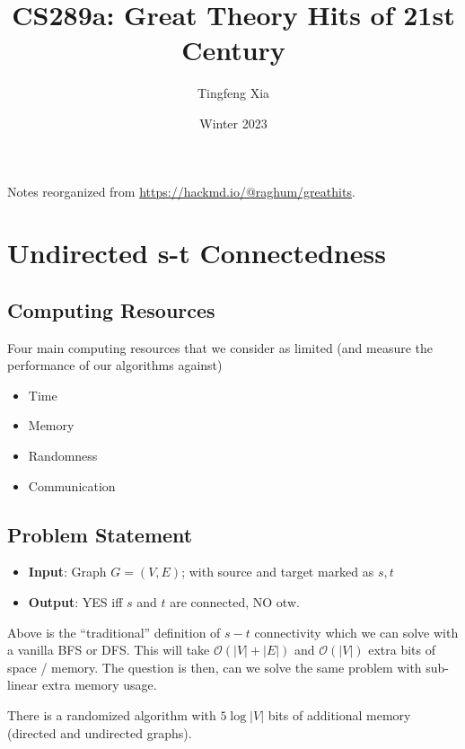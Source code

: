 \documentclass[11pt, letter]{book}
\author{Tingfeng Xia}
\title{CS289a: Great Theory Hits of 21st Century}
\date{Winter 2023}
\begin{document}
\maketitle

\vspace*{\fill}
Notes reorganized from \url{https://hackmd.io/@raghum/greathits}.\newline \newline 
\doclicenseThis

\tableofcontents

\chapter{Undirected s-t Connectedness}

\section{Computing Resources}
Four main computing resources that we consider as limited (and measure the performance of our algorithms against)
\begin{itemize}
	\item Time 
	\item Memory
	\item Randomness
	\item Communication
\end{itemize}

\section{Problem Statement}

\begin{itemize}
	\item \textbf{Input}: Graph $G = (V, E)$; with source and target marked as $s, t$
	\item \textbf{Output}: YES iff $s$ and $t$ are connected, NO otw.
\end{itemize}

Above is the ``traditional'' definition of $s-t$ connectivity which we can solve with a vanilla BFS or DFS. This will take $\mathcal O ( |V| + |E| ) $ and $\mathcal O (|V| )$ extra bits of space / memory. The question is then, can we solve the same problem with sub-linear extra memory usage. 

\begin{proposition}
	There is a randomized algorithm with $5 \log |V|$ bits of additional memory (directed and undirected graphs). 
\end{proposition}
\end{document}
